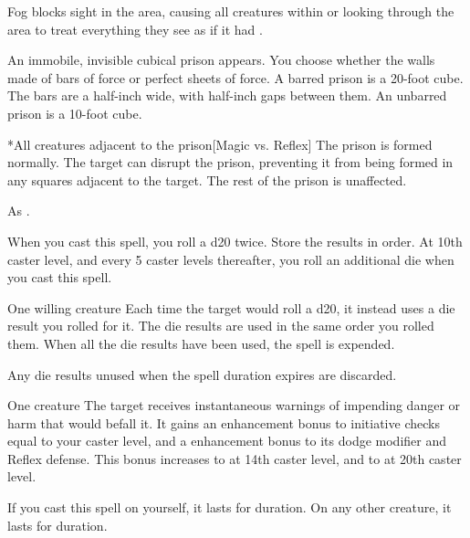 \spelldur{\durshort}
\spellline
\spelleffect Fog blocks sight in the area, causing all creatures within or looking through the area to treat everything they see as if it had \concealment.
\spellnotes \fogspellnotes

\spellrng{\rngmed}
\spelldur{\durlong \dismissable}
\spellline
\spelleffect An immobile, invisible cubical prison appears. You choose whether the walls made of bars of force or perfect sheets of force. A barred prison is a 20-foot cube. The bars are a half-inch wide, with half-inch gaps between them. An unbarred prison is a 10-foot cube.
\begin{spelltarget}*{All creatures adjacent to the prison}[Magic vs. Reflex]
    \spellsuccess The prison is formed normally.
    \spellfailure The target can disrupt the prison, preventing it from being formed in any squares adjacent to the target. The rest of the prison is unaffected.
\end{spelltarget}
\spellnotes As .

\spellrng{\rngmed}
\spellspecial When you cast this spell, you roll a d20 twice. Store the results in order. At 10th caster level, and every 5 caster levels thereafter, you roll an additional die when you cast this spell.
\begin{spelltarget}{One willing creature}
    \spelleffect Each time the target would roll a d20, it instead uses a die result you rolled for it. The die results are used in the same order you rolled them. When all the die results have been used, the spell is expended.
\end{spelltarget}
\spellnotes Any die results unused when the spell duration expires are discarded.

\begin{spelltarget}{One creature}
    \spelleffect The target receives instantaneous warnings of impending danger or harm that would befall it. It gains an enhancement bonus to initiative checks equal to your caster level, and a  enhancement bonus to its dodge modifier and Reflex defense. This bonus increases to  at 14th caster level, and to  at 20th caster level.
    \par If you cast this spell on yourself, it lasts for \durlong duration. On any other creature, it lasts for \durshort duration.
\end{spelltarget}

